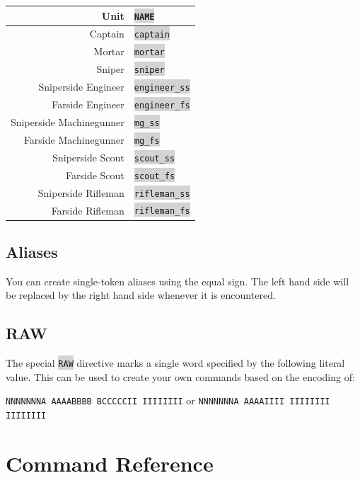 \documentclass{article}
\newcommand{\vnscode}[1]{\colorbox{lightgray}{\lstinline[language=vns]{#1}}}
\begin{document}
\begin{minipage}{\textwidth}
\centering
\begin{tabular}{|r|l|}
    \hline Unit & \vnscode{NAME} \\ \hline
    Captain & \vnscode{captain} \\ \hline
    Mortar & \vnscode{mortar} \\ \hline
    Sniper & \vnscode{sniper} \\ \hline
    Sniperside Engineer & \vnscode{engineer_ss} \\ \hline
    Farside Engineer & \vnscode{engineer_fs} \\ \hline
    Sniperside Machinegunner & \vnscode{mg_ss} \\ \hline
    Farside Machinegunner & \vnscode{mg_fs} \\ \hline
    Sniperside Scout & \vnscode{scout_ss} \\ \hline
    Farside Scout & \vnscode{scout_fs} \\ \hline
    Sniperside Rifleman & \vnscode{rifleman_ss} \\ \hline
    Farside Rifleman & \vnscode{rifleman_fs} \\ \hline
\end{tabular}
\end{minipage}

\subsection{Aliases}

You can create single-token aliases using the equal sign. The left hand side
will be replaced by the right hand side whenever it is encountered.

\subsection{RAW}

The special \vnscode{RAW} directive marks a single word specified by the
following literal value. This can be used to create your own commands based on
the encoding of:

\texttt{NNNNNNNA AAAABBBB BCCCCCII IIIIIIII} or \texttt{NNNNNNNA AAAAIIII IIIIIIII IIIIIIII}

\section{Command Reference}
\end{document}
